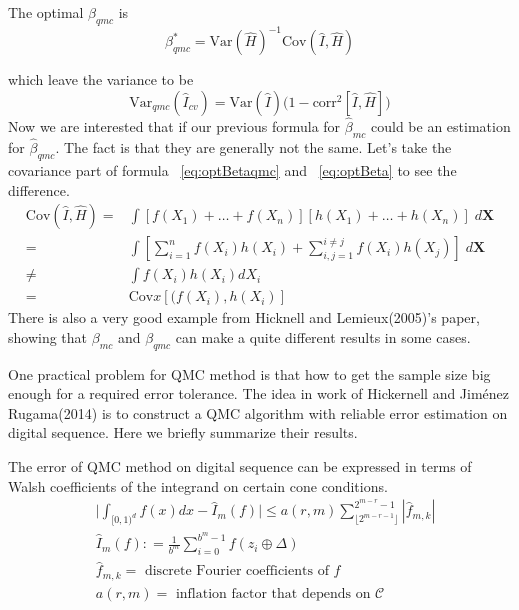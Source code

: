 The optimal $\beta_{qmc}$ is
\begin{equation}
    \beta_{qmc}^*= \mathrm{Var} (\hat{H})^{-1}\mathrm{Cov} (\hat{I}, \hat{H})
    \label{eq:optBetaqmc}
\end{equation}

which leave the variance to be
\[
    \mathrm{Var}_{qmc}(\hat{I}_{cv})=\mathrm{Var}(\hat{I})\big(1-\mathrm{corr}^2[\hat{I}, \hat{H}]\big)
\]
Now we are interested that if our previous formula for $\hat{\beta}_{mc}$ could be an estimation for $\hat{\beta}_{qmc}$. The fact is that they are generally not the same. Let's take the covariance part of formula ~\eqref{eq:optBetaqmc} and ~\eqref{eq:optBeta} to see the difference. 
\begin{align*}
    \mathrm{Cov}(\hat{I}, \hat{H})=&\int [f(X_1)+\dots+f(X_n)][h(X_1)+\dots+h(X_n)]\; d\mathbf{X}\\
    =&\int [\sum_{i=1}^{n}f(X_i)h(X_i) + \sum_{i,j=1}^{i\neq j}f(X_i)h(X_j)]\; d\mathbf{X}\\
    \neq&\int f(X_i)h(X_i)dX_i\\
    =&\mathrm{Cov}x[(f(X_i),h(X_i)]
\end{align*}
There is also a very good example from Hicknell and Lemieux(2005)\cite{hickernell2005control}'s paper, showing that $\beta_{mc}$ and $\beta_{qmc}$ can make a quite different results in some cases. 



One practical problem for QMC method is that how to get the sample size big enough for a required error tolerance. The idea in work of Hickernell and Jiménez Rugama(2014)\cite{hickernell2014reliable} is to construct a QMC algorithm with reliable error estimation on digital sequence. Here we briefly summarize their results.

The error of QMC method on digital sequence can be expressed in terms of Walsh coefficients of the integrand on certain cone conditions. 
\begin{align*}
&\Big|\int_{[0,1)^d}f(x)dx - \hat{I}_m(f)\Big| \leq a(r,m) \sum_{\lfloor 2^{m-r-1} \rfloor}^{2^{m-r}-1} |\hat{f}_{m,k}|\\
&\hat{I}_m(f): = \frac{1}{b^m}\sum_{i=0}^{b^m-1}f(z_i\oplus \Delta)\\
&\hat{f}_{m,k}=\text{ discrete Fourier coefficients of }f\\
&a(r,m) =\text{ inflation factor that depends on } \mathcal{C}
\end{align*}


